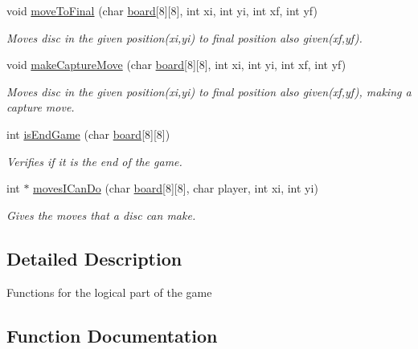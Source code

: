 \begin{DoxyCompactItemize}
void \hyperlink{group___program_logic_ga484dd8982591f724c6ff6749bba6869a}{move\+To\+Final} (char \hyperlink{checkers_8c_a12f50bd537a3a737da9d47710c308ae3}{board}\mbox{[}8\mbox{]}\mbox{[}8\mbox{]}, int xi, int yi, int xf, int yf)
\begin{DoxyCompactList}\small\item\em Moves disc in the given position(xi,yi) to final position also given(xf,yf). \end{DoxyCompactList}\item 
void \hyperlink{group___program_logic_ga5de7cebab5418f009cebb5dc73e50cd2}{make\+Capture\+Move} (char \hyperlink{checkers_8c_a12f50bd537a3a737da9d47710c308ae3}{board}\mbox{[}8\mbox{]}\mbox{[}8\mbox{]}, int xi, int yi, int xf, int yf)
\begin{DoxyCompactList}\small\item\em Moves disc in the given position(xi,yi) to final position also given(xf,yf), making a capture move. \end{DoxyCompactList}\item 
int \hyperlink{group___program_logic_gacfd2089a907444dab0ccd2d95f321b8b}{is\+End\+Game} (char \hyperlink{checkers_8c_a12f50bd537a3a737da9d47710c308ae3}{board}\mbox{[}8\mbox{]}\mbox{[}8\mbox{]})
\begin{DoxyCompactList}\small\item\em Verifies if it is the end of the game. \end{DoxyCompactList}\item 
int $\ast$ \hyperlink{group___program_logic_ga8d87858478876b33304e38cea751951b}{moves\+I\+Can\+Do} (char \hyperlink{checkers_8c_a12f50bd537a3a737da9d47710c308ae3}{board}\mbox{[}8\mbox{]}\mbox{[}8\mbox{]}, char player, int xi, int yi)
\begin{DoxyCompactList}\small\item\em Gives the moves that a disc can make. \end{DoxyCompactList}\end{DoxyCompactItemize}


\subsection{Detailed Description}
Functions for the logical part of the game 

\subsection{Function Documentation}
\hypertarget{group___program_logic_ga2838b9e6247aa4515f76cfeccf8e1cd8}{}\label{group___program_logic_ga2838b9e6247aa4515f76cfeccf8e1cd8} 
